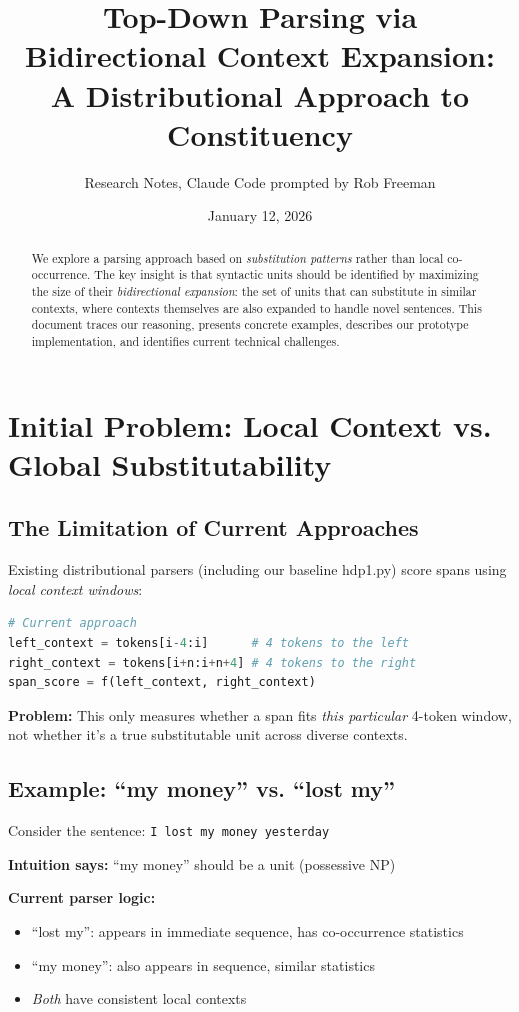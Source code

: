 \documentclass[11pt]{article}
\title{Top-Down Parsing via Bidirectional Context Expansion:\\
A Distributional Approach to Constituency}
\author{Research Notes, Claude Code prompted by Rob Freeman}
\date{January 12, 2026}
\begin{document}
\maketitle

\begin{abstract}
We explore a parsing approach based on \emph{substitution patterns} rather than local co-occurrence. The key insight is that syntactic units should be identified by maximizing the size of their \emph{bidirectional expansion}: the set of units that can substitute in similar contexts, where contexts themselves are also expanded to handle novel sentences. This document traces our reasoning, presents concrete examples, describes our prototype implementation, and identifies current technical challenges.
\end{abstract}

\section{Initial Problem: Local Context vs. Global Substitutability}

\subsection{The Limitation of Current Approaches}

Existing distributional parsers (including our baseline hdp1.py) score spans using \emph{local context windows}:

\begin{lstlisting}[language=Python]
# Current approach
left_context = tokens[i-4:i]      # 4 tokens to the left
right_context = tokens[i+n:i+n+4] # 4 tokens to the right
span_score = f(left_context, right_context)
\end{lstlisting}

\textbf{Problem:} This only measures whether a span fits \emph{this particular} 4-token window, not whether it's a true substitutable unit across diverse contexts.

\subsection{Example: ``my money'' vs. ``lost my''}

Consider the sentence: \texttt{I lost my money yesterday}

\textbf{Intuition says:} ``my money'' should be a unit (possessive NP)

\textbf{Current parser logic:}
\begin{itemize}
\item ``lost my'': appears in immediate sequence, has co-occurrence statistics
\item ``my money'': also appears in sequence, similar statistics
\item \emph{Both} have consistent local contexts
\end{itemize}
\end{document}
